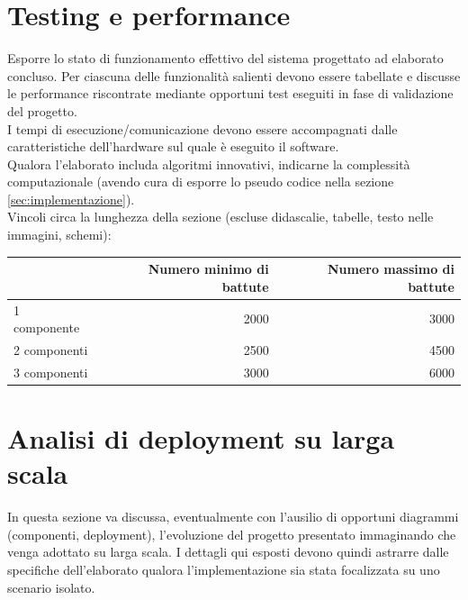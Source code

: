 \documentclass[12pt]{article}
\begin{document}

\section{Testing e performance}

Esporre lo stato di funzionamento effettivo del sistema progettato ad elaborato concluso. Per ciascuna delle funzionalità salienti devono essere tabellate e discusse le performance riscontrate mediante opportuni test eseguiti in fase di validazione del progetto.\\

I tempi di esecuzione/comunicazione devono essere accompagnati dalle caratteristiche dell'hardware sul quale è eseguito il software.\\

Qualora l'elaborato includa algoritmi innovativi, indicarne la complessità computazionale (avendo cura di esporre lo pseudo codice nella sezione \ref{sec:implementazione}).\\


Vincoli circa la lunghezza della sezione (escluse didascalie, tabelle, testo nelle immagini, schemi):

\vspace{1cm}
\begin{tabular}{l|rr}
 & Numero minimo di battute & Numero massimo di battute \\
 \hline
 1 componente & 2000 & 3000 \\
 2 componenti & 2500 & 4500 \\
 3 componenti & 3000 & 6000 \\
 \hline
\end{tabular}


\newpage



\section{Analisi di deployment su larga scala}

In questa sezione va discussa, eventualmente con l'ausilio di opportuni diagrammi (componenti, deployment), l'evoluzione del progetto presentato immaginando che venga adottato su larga scala. I dettagli qui esposti devono quindi astrarre dalle specifiche dell'elaborato qualora l'implementazione sia stata focalizzata su uno scenario isolato.\\
\end{document}
